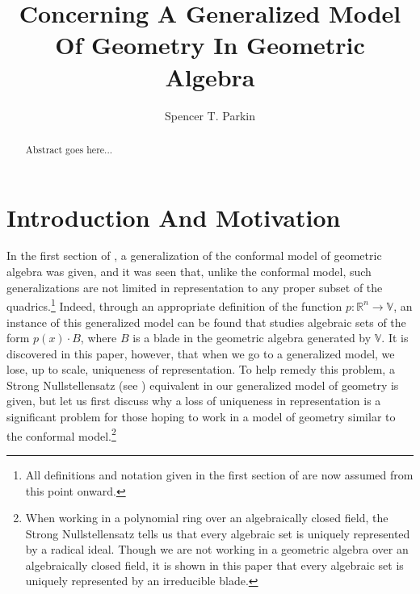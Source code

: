 \documentclass{birkjour}
\theoremstyle{definition}
\theoremstyle{remark}
\numberwithin{equation}{section}
\newcommand{\R}{\mathbb{R}}
\newcommand{\V}{\mathbb{V}}
\begin{document}
\title{Concerning A Generalized Model\\Of Geometry In Geometric Algebra}

\author{Spencer T. Parkin}
\address{102 W. 500 S., \\
Salt Lake City, UT  84101} 



\begin{abstract}
Abstract goes here...
\end{abstract}


\maketitle

\section{Introduction And Motivation}

In the first section of \cite{Parkin13}, a generalization of the conformal model
of geometric algebra was given, and it was seen that, unlike the conformal model,
such generalizations are not limited in representation to any proper subset of the quadrics.\footnote{All definitions
and notation given in the first section of \cite{Parkin13} are now assumed from this point onward.}
Indeed, through an appropriate definition of the function $p:\R^n\to\V$, an instance of this generalized
model can be found that studies algebraic sets of the form $p(x)\cdot B$, where $B$
is a blade in the geometric algebra generated by $\V$.  It is discovered in this paper, however,
that when we go to a generalized model, we lose, up to scale, uniqueness of representation.
To help remedy this problem, a Strong Nullstellensatz (see \cite{}) equivalent in our generalized
model of geometry is given, but let us first discuss why a loss of uniqueness in representation
is a significant problem for those hoping to work in a model of geometry similar to the conformal model.\footnote{When
working in a polynomial ring over an algebraically closed field, the Strong Nullstellensatz tells us that every algebraic set is uniquely
represented by a radical ideal.  Though we are not working in a geometric algebra over an algebraically closed field,
it is shown in this paper that every algebraic set is uniquely represented by an irreducible blade.}
\end{document}
